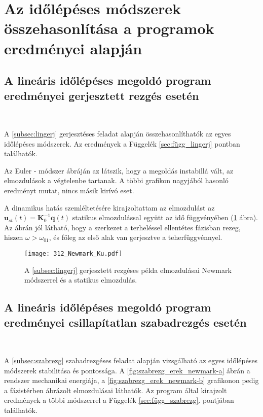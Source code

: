\section{Az időlépéses módszerek összehasonlítása a programok eredményei alapján}\label{sec: msz összehasonlítás}

\subsection{A lineáris időlépéses megoldó program eredményei gerjesztett rezgés esetén}\label{subsec: lin eredmény gerj}

{\ }

A \ref{subsec:lingerj} gerjesztéses feladat alapján összehasonlíthatók az egyes időlépéses módszerek. Az eredmények a Függelék \ref{sec:függ_lingerj} pontban találhatók. 

Az Euler - módszer ábráján az látszik, hogy a megoldás instabillá vált, az elmozdulások a végtelenbe tartanak. A többi grafikon nagyjából hasonló eredményt mutat, nincs másik kirívó eset.

A dinamikus hatás szemléltetésére kirajzoltattam az elmozdulást az $\mathbf{u}_{st}(t) = \mathbf{K}_0^{-1}\mathbf{q}(t)$ statikus elmozdulással együtt az idő függvényében (\ref{fig:lingerjeredm_newmark_Ku} ábra). Az ábrán jól látható, hogy a szerkezet a terheléssel ellentétes fázisban rezeg, hiszen $\omega > \omega_{01}$, és főleg az első alak van gerjesztve a teherfüggvénnyel.

\begin{figure}[H]
\centering
\texttt{[image: 312\_Newmark\_Ku.pdf]}
\caption{A \ref{subsec:lingerj} gerjesztett rezgéses példa elmozdulásai Newmark módszerrel és a statikus elmozdulás.}
\label{fig:lingerjeredm_newmark_Ku}
\end{figure}



\subsection{A lineáris időlépéses megoldó program eredményei csillapítatlan szabadrezgés esetén}\label{subsec: lin eredmény szabrezg}

{\ }

 A \ref{subsec:szabrezg} szabadrezgéses feladat alapján vizsgálható az egyes időlépéses módszerek stabilitása és pontossága. A \ref {fig:szabrezg_erek_newmark-a} ábrán a rendszer mechanikai energiája, a \ref{fig:szabrezg_erek_newmark-b} grafikonon pedig a fázistérben ábrázolt elmozdulásai láthatók. Az program által kirajzolt  eredmények  a többi módszerrel a Függelék \ref{sec:függ_szabrezg}.  pontjában találhatók. 
 
